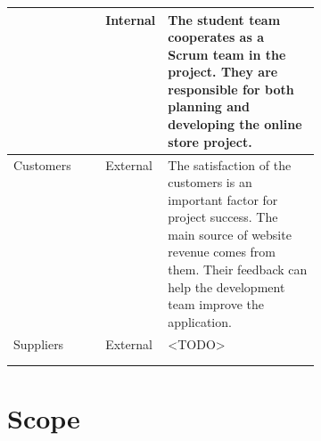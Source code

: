 \documentclass{report}
\begin{document}
\begin{tabularx}{0.95\linewidth}{%
  >{\raggedright\arraybackslash}p{0.3\linewidth}%
  >{\raggedright\arraybackslash}p{0.1\linewidth}%
  >{\raggedright\arraybackslash}X}
  & Internal
  & The student team cooperates as a Scrum team in the project. They are responsible for both planning and developing the online store project. 
  \\
  \midrule
  Customers
  & External
  & The satisfaction of the customers is an important factor for project success. The main source of website revenue comes from them. Their feedback can help the development team improve the application.
  \\
  \midrule
  Suppliers
  & External
  & <TODO>
  \\
  \bottomrule
  \\
  \caption{Stakeholder Register}  
  \label{tab:stakeholderRegister}
\end{tabularx}

\section{Scope}
\end{document}
